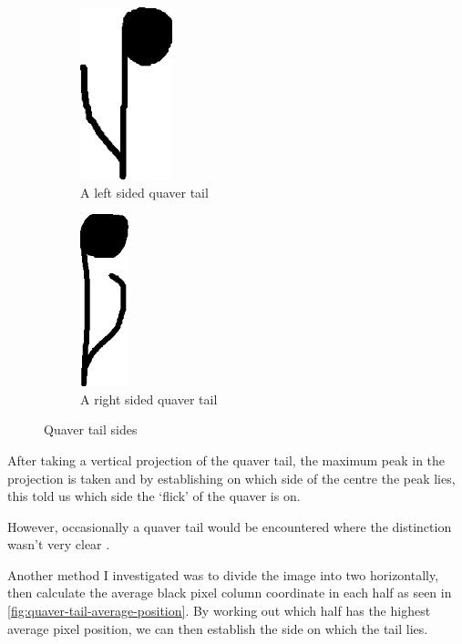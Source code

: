 \begin{figure}[h!]
    \centering

    \begin{subfigure}[b]{.45\linewidth}
        \centering
      \includegraphics[height=5cm]{gfx/techniques/quaver-left-6087.png}
      \caption{A left sided quaver tail}
      \label{fig:quaver-tail-left}
    \end{subfigure}
    \begin{subfigure}[b]{.45\linewidth}
        \centering
      \includegraphics[height=5cm]{gfx/techniques/quaver-right-3083.png}
      \caption{A right sided quaver tail}
      \label{fig:quaver-tail-right}
    \end{subfigure}

    \caption{Quaver tail sides}
\end{figure}

After taking a vertical projection of the quaver tail, the maximum peak in the projection is taken and by establishing on which side of the centre the peak lies, this told us which side the `flick' of the quaver is on.

However, occasionally a quaver tail would be encountered where the distinction wasn't very clear .

Another method I investigated was to divide the image into two horizontally, then calculate the average black pixel column coordinate in each half as seen in \cref{fig:quaver-tail-average-position}. By working out which half has the highest average pixel position, we can then establish the side on which the tail lies.

